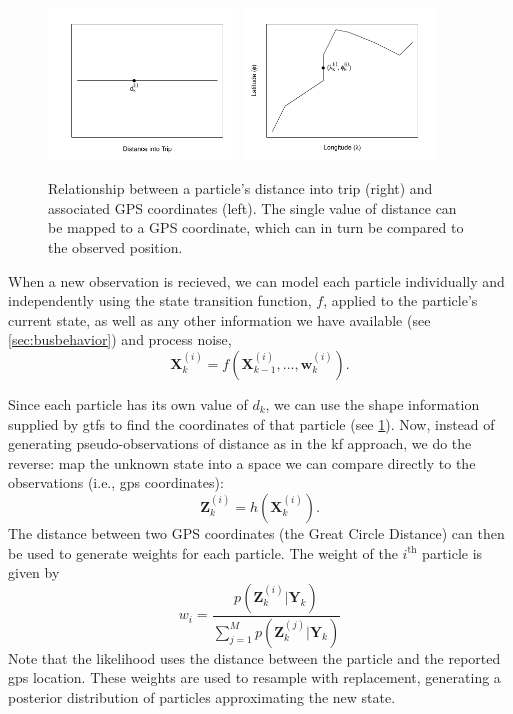 \documentclass[12pt,a4paper]{article}
\newcommand{\bY}{\mathbf{Y}}
\newcommand{\bX}{\mathbf{X}}
\newcommand{\bZ}{\mathbf{Z}}
\newcommand{\mat}[1]{\mathbf{#1}}
\begin{document}
\begin{figure}[b]
  \centering
  \includegraphics[width=0.45\textwidth]{gps-dist2.jpg}
  \includegraphics[width=0.45\textwidth]{gps-dist1.jpg}
  \caption{Relationship between a particle's distance into trip (right) and associated GPS coordinates
  (left). The single value of distance can be mapped to a GPS coordinate,
  which can in turn be compared to the observed position.}
  \label{fig:gps-dist}
\end{figure}


When a new observation is recieved,
we can model each particle individually and independently using the state transition function, $f$,
applied to the particle's current state,
as well as any other information we have available (see \cref{sec:busbehavior}) and process noise,
\begin{equation}
  \label{eq:pf_statetransition}
  \bX_k^{(i)} = f(\bX_{k-1}^{(i)}, \ldots, \mat{w}_k^{(i)}).
\end{equation}


Since each particle has its own value of $d_k$, 
we can use the shape information supplied by \gls{gtfs} to
find the coordinates of that particle (see \cref{fig:gps-dist}).
Now, instead of generating pseudo-observations of distance
as in the \gls{kf} approach, we do the reverse: map the unknown state into 
a space we can compare directly to the observations (i.e., \gls{gps} coordinates):
\begin{equation}
  \label{eq:pf_measurement}
  \bZ_k^{(i)} = h(\bX_k^{(i)}).
\end{equation}
The distance between two GPS coordinates (the Great Circle Distance)
can then be used to generate weights for each particle.
The weight of the $i^{\mathrm{th}}$ particle is given by
\begin{equation}
  \label{eq:pf_likelihood}
  w_i = \frac{p(\bZ_k^{(i)} | \bY_k)}{\sum_{j=1}^M p(\bZ_k^{(j)} | \bY_k)}
\end{equation}
Note that the likelihood uses the distance between the particle and the 
reported \gls{gps} location.
These weights are used to resample with replacement, generating a posterior distribution 
of particles approximating the new state.
\end{document}
